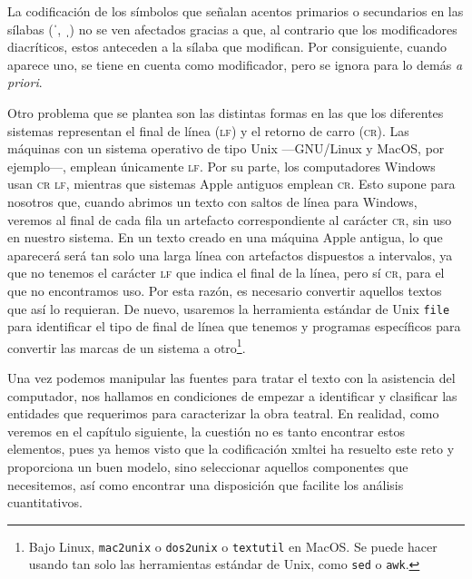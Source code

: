La codificación de los símbolos que señalan acentos primarios o secundarios en las sílabas  (ˈ, ˌ) no se ven afectados gracias a que, al contrario que los modificadores diacríticos, estos anteceden a la sílaba que modifican. Por consiguiente, cuando aparece uno, se tiene en cuenta como modificador, pero se ignora para lo demás \textit{a priori}.

Otro problema que se plantea son las distintas formas en las que los diferentes sistemas representan el final de línea (\textsc{lf}) y el retorno de carro  (\textsc{cr}). Las máquinas con un sistema operativo de tipo Unix —GNU/Linux y MacOS, por ejemplo—, emplean únicamente \textsc{lf}. Por su parte, los computadores Windows usan \textsc{cr} \textsc{lf}, mientras que sistemas Apple antiguos emplean \textsc{cr}. Esto supone para nosotros que, cuando abrimos un texto con saltos de línea para Windows, veremos al final de cada fila un artefacto correspondiente al carácter \textsc{cr}, sin uso en nuestro sistema. En un texto creado en una máquina Apple antigua, lo que aparecerá será tan solo una larga línea con artefactos dispuestos a intervalos, ya que no tenemos el carácter \textsc{lf} que indica el final de la línea, pero sí \textsc{cr}, para el que no encontramos uso.  Por esta razón, es necesario convertir aquellos textos que así lo requieran. De nuevo, usaremos la herramienta estándar de Unix \texttt{file} para identificar el tipo de final de línea que tenemos y programas específicos para convertir las marcas de un sistema a otro\footnote{Bajo Linux, \texttt{mac2unix} o \texttt{dos2unix} o \texttt{textutil} en MacOS. Se puede hacer usando tan solo las herramientas estándar de Unix, como \texttt{sed} o \texttt{awk}.}.

Una vez podemos manipular las fuentes para tratar el texto con la asistencia del computador, nos hallamos en condiciones de empezar a identificar y clasificar las entidades que requerimos para caracterizar la obra teatral. En realidad, como veremos en el capítulo siguiente, la cuestión no es tanto encontrar estos elementos, pues ya hemos visto que la codificación \ac{xmltei} ha resuelto este reto y proporciona un buen modelo, sino seleccionar aquellos componentes que necesitemos, así como encontrar una disposición que facilite los análisis cuantitativos. 
